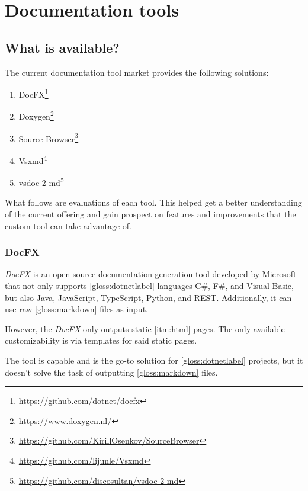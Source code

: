 
\chapter{Documentation tools}
\section{What is available?} \label{sec:whatisavailable}
The current documentation tool market provides the following solutions:

\begin{enumerate}
    \item DocFX\footnote{\href{https://github.com/dotnet/docfx}{https://github.com/dotnet/docfx}}
    \item Doxygen\footnote{\href{https://www.doxygen.nl/}{https://www.doxygen.nl/}}
    \item Source Browser\footnote{\href{https://github.com/KirillOsenkov/SourceBrowser}{https://github.com/KirillOsenkov/SourceBrowser}}
    \item Vsxmd\footnote{\href{https://github.com/lijunle/Vsxmd}{https://github.com/lijunle/Vsxmd}}
    \item vsdoc-2-md\footnote{\href{https://github.com/discosultan/vsdoc-2-md}{https://github.com/discosultan/vsdoc-2-md}}
\end{enumerate}

What follows are evaluations of each tool. This helped get a better understanding of the current offering and gain prospect on features and improvements that the custom tool can take advantage of.

\subsection{DocFX} \label{ssec:docfx}

\textit{DocFX} is an open-source documentation generation tool developed by Microsoft that not only supports \ref{gloss:dotnetlabel} languages C\#, F\#, and Visual Basic, but also Java, JavaScript, TypeScript, Python, and REST. Additionally, it can use raw \ref{gloss:markdown} files as input.

However, the \textit{DocFX} only outputs static \ref{itm:html} pages. The only available customizability is via templates for said static pages.

The tool is capable and is the go-to solution for \ref{gloss:dotnetlabel} projects, but it doesn't solve the task of outputting \ref{gloss:markdown} files.


